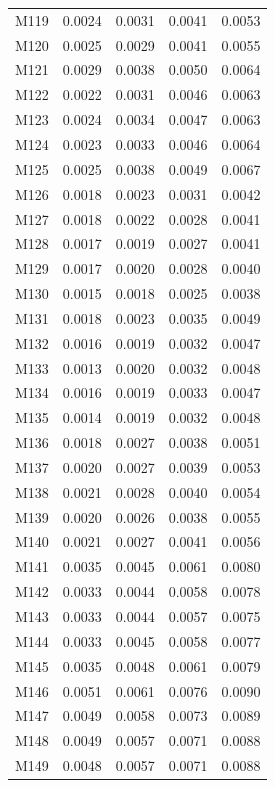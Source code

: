 \begin{longtable}{lrrrr}
M119 & 0.0024 & 0.0031 & 0.0041 & 0.0053 \\
M120 & 0.0025 & 0.0029 & 0.0041 & 0.0055 \\
M121 & 0.0029 & 0.0038 & 0.0050 & 0.0064 \\
M122 & 0.0022 & 0.0031 & 0.0046 & 0.0063 \\
M123 & 0.0024 & 0.0034 & 0.0047 & 0.0063 \\
M124 & 0.0023 & 0.0033 & 0.0046 & 0.0064 \\
M125 & 0.0025 & 0.0038 & 0.0049 & 0.0067 \\
M126 & 0.0018 & 0.0023 & 0.0031 & 0.0042 \\
M127 & 0.0018 & 0.0022 & 0.0028 & 0.0041 \\
M128 & 0.0017 & 0.0019 & 0.0027 & 0.0041 \\
M129 & 0.0017 & 0.0020 & 0.0028 & 0.0040 \\
M130 & 0.0015 & 0.0018 & 0.0025 & 0.0038 \\
M131 & 0.0018 & 0.0023 & 0.0035 & 0.0049 \\
M132 & 0.0016 & 0.0019 & 0.0032 & 0.0047 \\
M133 & 0.0013 & 0.0020 & 0.0032 & 0.0048 \\
M134 & 0.0016 & 0.0019 & 0.0033 & 0.0047 \\
M135 & 0.0014 & 0.0019 & 0.0032 & 0.0048 \\
M136 & 0.0018 & 0.0027 & 0.0038 & 0.0051 \\
M137 & 0.0020 & 0.0027 & 0.0039 & 0.0053 \\
M138 & 0.0021 & 0.0028 & 0.0040 & 0.0054 \\
M139 & 0.0020 & 0.0026 & 0.0038 & 0.0055 \\
M140 & 0.0021 & 0.0027 & 0.0041 & 0.0056 \\
M141 & 0.0035 & 0.0045 & 0.0061 & 0.0080 \\
M142 & 0.0033 & 0.0044 & 0.0058 & 0.0078 \\
M143 & 0.0033 & 0.0044 & 0.0057 & 0.0075 \\
M144 & 0.0033 & 0.0045 & 0.0058 & 0.0077 \\
M145 & 0.0035 & 0.0048 & 0.0061 & 0.0079 \\
M146 & 0.0051 & 0.0061 & 0.0076 & 0.0090 \\
M147 & 0.0049 & 0.0058 & 0.0073 & 0.0089 \\
M148 & 0.0049 & 0.0057 & 0.0071 & 0.0088 \\
M149 & 0.0048 & 0.0057 & 0.0071 & 0.0088 \\

\end{longtable}
